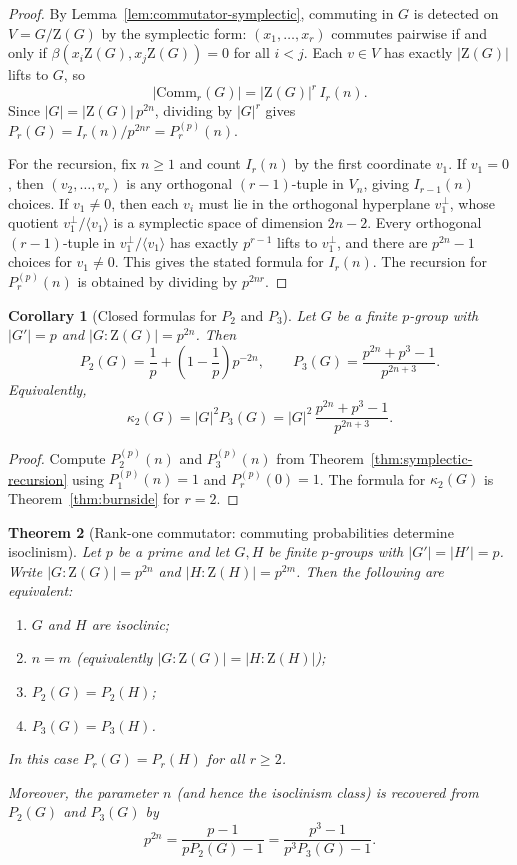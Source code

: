 \documentclass[11pt]{article}
\newtheorem{theorem}{Theorem}[section]
\newtheorem{corollary}[theorem]{Corollary}
\theoremstyle{definition}
\theoremstyle{remark}
\theoremstyle{definition}
\theoremstyle{plain}
\newcommand{\Z}{\mathrm{Z}}
\newcommand{\Comm}{\mathrm{Comm}}
\begin{document}
\begin{proof}
By Lemma~\ref{lem:commutator-symplectic}, commuting in $G$ is detected on $V=G/\Z(G)$ by the symplectic form:
$(x_1,\dots,x_r)$ commutes pairwise if and only if $\beta(x_i\Z(G),x_j\Z(G))=0$ for all $i<j$.
Each $v\in V$ has exactly $|\Z(G)|$ lifts to $G$, so
\[
|\Comm_r(G)|=|\Z(G)|^r\,I_r(n).
\]
Since $|G|=|\Z(G)|\,p^{2n}$, dividing by $|G|^r$ gives $P_r(G)=I_r(n)/p^{2nr}=P_r^{(p)}(n)$.

For the recursion, fix $n\ge 1$ and count $I_r(n)$ by the first coordinate $v_1$.
If $v_1=0$, then $(v_2,\dots,v_r)$ is any orthogonal $(r-1)$-tuple in $V_n$, giving $I_{r-1}(n)$ choices.
If $v_1\neq 0$, then each $v_i$ must lie in the orthogonal hyperplane $v_1^\perp$, whose quotient
$v_1^\perp/\langle v_1\rangle$ is a symplectic space of dimension $2n-2$.
Every orthogonal $(r-1)$-tuple in $v_1^\perp/\langle v_1\rangle$ has exactly $p^{r-1}$ lifts to $v_1^\perp$,
and there are $p^{2n}-1$ choices for $v_1\neq 0$.
This gives the stated formula for $I_r(n)$.
The recursion for $P_r^{(p)}(n)$ is obtained by dividing by $p^{2nr}$.
\end{proof}

\begin{corollary}[Closed formulas for $P_2$ and $P_3$]\label{cor:orderp-P2P3}
Let $G$ be a finite $p$-group with $|G'|=p$ and $|G:\Z(G)|=p^{2n}$.
Then
\[
P_2(G)=\frac{1}{p}+\left(1-\frac{1}{p}\right)p^{-2n},
\qquad
P_3(G)=\frac{p^{2n}+p^3-1}{p^{2n+3}}.
\]
Equivalently,
\[
\kappa_2(G)=|G|^2P_3(G)=|G|^2\,\frac{p^{2n}+p^3-1}{p^{2n+3}}.
\]
\end{corollary}

\begin{proof}
Compute $P_2^{(p)}(n)$ and $P_3^{(p)}(n)$ from Theorem~\ref{thm:symplectic-recursion} using $P_1^{(p)}(n)=1$
and $P_r^{(p)}(0)=1$.
The formula for $\kappa_2(G)$ is Theorem~\ref{thm:burnside} for $r=2$.
\end{proof}

\begin{theorem}[Rank-one commutator: commuting probabilities determine isoclinism]\label{thm:rank1-isoclinism}
Let $p$ be a prime and let $G,H$ be finite $p$-groups with $|G'|=|H'|=p$.
Write $|G:\Z(G)|=p^{2n}$ and $|H:\Z(H)|=p^{2m}$.
Then the following are equivalent:
\begin{enumerate}
\item $G$ and $H$ are isoclinic;
\item $n=m$ (equivalently $|G:\Z(G)|=|H:\Z(H)|$);
\item $P_2(G)=P_2(H)$;
\item $P_3(G)=P_3(H)$.
\end{enumerate}
In this case $P_r(G)=P_r(H)$ for all $r\ge 2$.

Moreover, the parameter $n$ (and hence the isoclinism class) is recovered from $P_2(G)$ and $P_3(G)$ by
\[
p^{2n}=\frac{p-1}{pP_2(G)-1}=\frac{p^3-1}{p^3P_3(G)-1}.
\]
\end{theorem}
\end{document}
